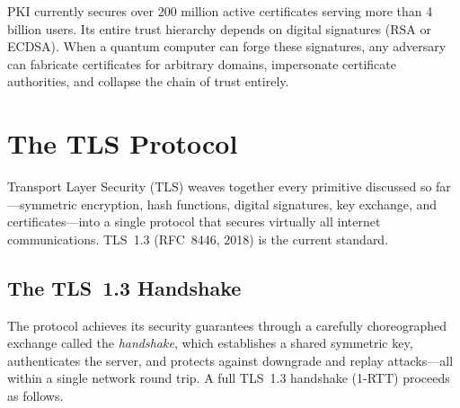 PKI currently secures over 200 million active certificates serving more than 4 billion users.  Its entire trust hierarchy depends on digital signatures (RSA or ECDSA).  When a quantum computer can forge these signatures, any adversary can fabricate certificates for arbitrary domains, impersonate certificate authorities, and collapse the chain of trust entirely.


\section{The TLS Protocol}
\label{sec:tls}

Transport Layer Security (TLS) weaves together every primitive discussed so far---symmetric encryption, hash functions, digital signatures, key exchange, and certificates---into a single protocol that secures virtually all internet communications.  TLS~1.3 (RFC~8446, 2018) is the current standard.

\subsection{The TLS~1.3 Handshake}
\label{subsec:tls-handshake}

The protocol achieves its security guarantees through a carefully choreographed exchange called the \emph{handshake}, which establishes a shared symmetric key, authenticates the server, and protects against downgrade and replay attacks---all within a single network round trip.  A full TLS~1.3 handshake (1-RTT) proceeds as follows.

